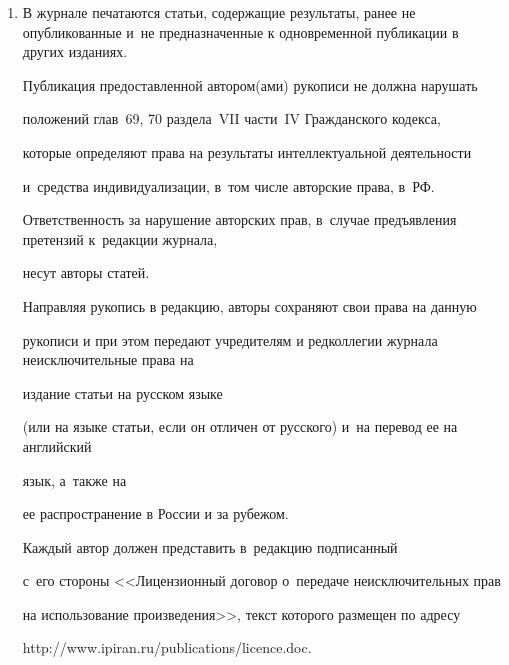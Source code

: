 {{\begin{itemize}
\end{itemize}





\noindent


\begin{enumerate}[1.]


\item В журнале печатаются статьи, содержащие результаты, ранее не опубликованные и~не предназначенные к одновременной публикации в других изданиях.







Публикация предоставленной автором(ами) рукописи не должна нарушать 


положений глав~69, 70 раздела~VII части~IV Гражданского кодекса, 


которые определяют права на результаты интеллектуальной деятельности 


и~средства индивидуализации, в~том числе авторские права, в~РФ.





Ответственность за нарушение авторских прав, в~случае предъявления претензий к~редакции журнала,  


несут авторы статей.











Направляя рукопись в редакцию, авторы сохраняют свои права на данную


рукописи и при этом передают учредителям и редколлегии журнала неисключительные права на


издание статьи на русском языке 


(или на языке статьи, если он отличен от рус\-ско\-го) и~на перевод ее на английский


язык, а~также на


ее распространение в России и за рубежом. 


Каждый автор должен представить в~редакцию подписанный 


с~его стороны <<Лицензионный договор о~передаче неисключительных прав 


на использование произведения>>, текст которого размещен по адресу 


{\sf http://www.ipiran.ru/publications/licence.doc}. 



\end{enumerate}}}
